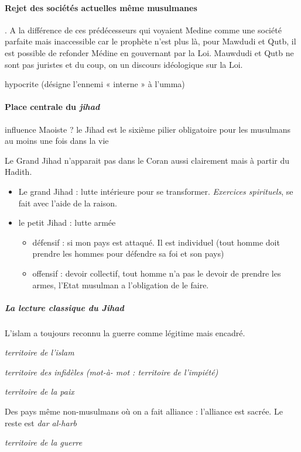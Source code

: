  \paragraph{Rejet des sociétés actuelles même musulmanes}. A la différence de ces prédécesseurs qui voyaient Medine comme une société parfaite mais inaccessible car le prophète n'est plus là, pour Mawdudi et Qutb, il est possible de refonder Médine en gouvernant par la Loi. Mauwdudi et Qutb ne sont pas juristes et du coup, on un discours idéologique sur la Loi.
  
  
  
 \begin{Def}[munafiq]
  {hypocrite (désigne l'ennemi}
{« interne » à l'umma)}
 \end{Def}
 


\paragraph{Place centrale du \emph{jihad}}

\begin{Synthesis}
influence Maoiste ? 
le Jihad est le sixième pilier obligatoire pour les musulmans au moins une fois dans la vie
\end{Synthesis}

Le Grand Jihad n'apparait pas dans le Coran aussi clairement mais à partir du Hadith.
\begin{itemize}
    \item Le grand Jihad : lutte intérieure pour se transformer. \textit{Exercices spirituels}, se fait avec l'aide de la raison. 
    \item le petit Jihad : lutte armée
    \begin{itemize}
        \item défensif : si mon pays est attaqué. Il est individuel (tout homme doit prendre les hommes pour défendre sa foi et son pays)
        \item offensif : devoir collectif, tout homme n'a pas le devoir de prendre les armes, l'Etat musulman a l'obligation de le faire. 
    \end{itemize}
\end{itemize}

\subparagraph{La lecture classique du Jihad} L'islam a toujours reconnu la guerre comme légitime mais encadré.
\begin{Def}
\emph{territoire de l'islam}
\end{Def}
\begin{Def}
\emph{territoire des infidèles (mot-à- mot : territoire de
l'impiété)}
\end{Def}
\begin{Def}
\emph{territoire de la paix}
\end{Def}
Des pays même non-musulmans où on a fait alliance : l'alliance est sacrée.
Le reste est \textit{dar al-harb}
\begin{Def}
\emph{territoire de la guerre}
\end{Def}


